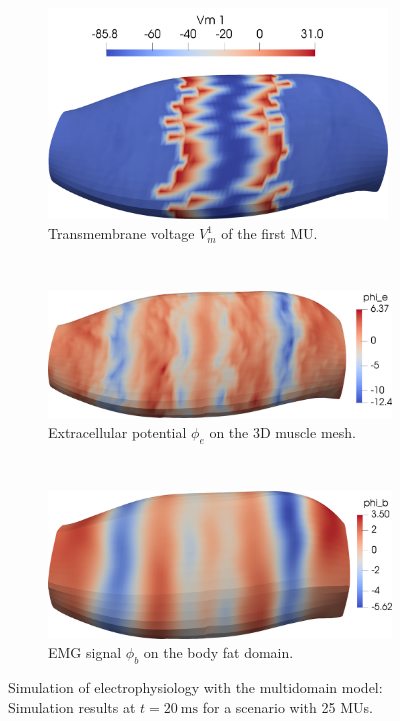 \begin{figure}
  \centering%
  \begin{subfigure}[t]{\textwidth}%
    \centering%
    \includegraphics[width=9cm]{images/results/application/multidomain_25mus_snapshot.png}%
    \caption{Transmembrane voltage $V_m^1$ of the first MU.}%
    \label{fig:multidomain_25mus_snapshot}%
  \end{subfigure} \\[4mm]
  \begin{subfigure}[t]{\textwidth}%
    \centering%
    \includegraphics[width=10cm]{images/results/application/multidomain_25mus2_emg.png}%
    \caption{Extracellular potential $\phi_e$ on the 3D muscle mesh.}%
    \label{fig:multidomain_25mus2_emg}%
  \end{subfigure} \\[4mm]
  \begin{subfigure}[t]{\textwidth}%
    \centering%
    \includegraphics[width=10cm]{images/results/application/multidomain_25mus2_body.png}%
    \caption{EMG signal $\phi_b$ on the body fat domain.}%
    \label{fig:multidomain_25mus2_body}%
  \end{subfigure}
  \caption{Simulation of electrophysiology with the multidomain model: Simulation results at $t=\SI{20}{\ms}$ for a scenario with 25 MUs.}%
  \label{fig:multidomain_25mus2}%
\end{figure}%


